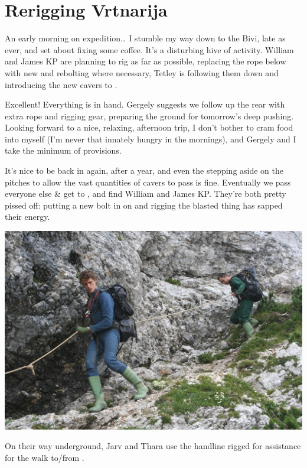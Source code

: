 \section{Rerigging Vrtnarija}


An early morning on expedition\ldots{} I stumble my way down to the
Bivi, late as ever, and set about fixing some coffee. It's a disturbing
hive of activity. William and James KP are planning to rig as far as
possible, replacing the rope below  with new and rebolting
where necessary, Tetley is following them down and introducing the new
cavers to .

Excellent! Everything is in hand. Gergely suggests we follow up the rear
with extra rope and rigging gear, preparing the ground for tomorrow's
deep pushing. Looking forward to a nice, relaxing, afternoon trip, I
don't bother to cram food into myself (I'm never that innately hungry in
the mornings), and Gergely and I take the minimum of provisions.

It's nice to be back in  again, after a year, and even
the stepping aside on the pitches to allow the vast quantities of cavers
to pass is fine. Eventually we pass everyone else \& get to , and
find William and James KP. They're both pretty pissed off: putting a new
bolt in on  and rigging the blasted thing has sapped their energy.


\begin{pagefigure}
\checkoddpage \ifoddpage \forcerectofloat \else \forceversofloat \fi
   \centering
\includegraphics[width = \textwidth]{2010/expo_stories/20100810-11-17-37 - Jana Carga 35--orig.jpg}
\caption{On their way underground, Jarv and Thara use the handline rigged for assistance for the walk to/from \protect{}. } \label{handline to GW}
\end{pagefigure}


